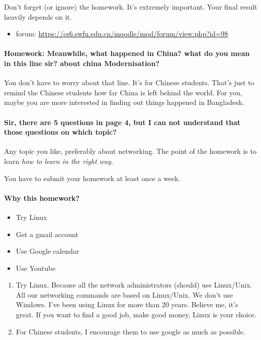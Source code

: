 \documentclass{article}
\begin{document}
Don't forget (or ignore) the homework. It's extremely important. Your final result heavily
depends on it.

\begin{itemize}
\item forum: \url{https://cs6.swfu.edu.cn/moodle/mod/forum/view.php?id=98}
\end{itemize}

\paragraph{Homework: Meanwhile, what happened in China? what do you mean in this line sir?
  about china Modernisation?}

You don't have to worry about that line. It's for Chinese students. That's just to remind
the Chinese students how far China is left behind the world. For you, maybe you are more
interested in finding out things happened in Bangladesh.

\paragraph{Sir, there are 5 questions in page 4, but I can not understand that those
  questions on which topic?}

Any topic you like, preferably about networking. The point of the homework is to learn
\emph{how to learn in the right way}.

You have to submit your homework at least once a week.

\paragraph{Why this homework?}
\begin{itemize}
\item Try Linux
\item Get a gmail account
\item Use Google calendar
\item Use Youtube
\end{itemize}

\begin{enumerate}
\item Try Linux. Because all the network administrators (should) use Linux/Unix. All our
  networking commands are based on Linux/Unix. We don't use Windows. I've been using Linux
  for more than 20 years. Believe me, it's great. If you want to find a good job, make
  good money, Linux is your choice.
\item For Chinese students, I encourage them to use google as much as possible.
\end{enumerate}
\end{document}
